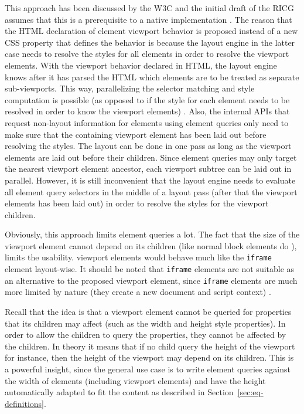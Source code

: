 \documentclass[a4paper,11pt]{kth-mag}
\newcommand{\code}[1]{\texttt{#1}}
\begin{document}
      This approach has been discussed by the \gls{W3C} and the initial draft of the \gls{RICG} assumes that this is a prerequisite to a \gls{native} implementation \cite{w3c_eq_mail,ricg_irc_log}.
      The reason that the \gls{HTML} declaration of element \gls{viewport} behavior is proposed instead of a new \gls{CSS} property that defines the behavior is because the \gls{layout engine} in the latter case needs to resolve the styles for all \glspl{element} in order to resolve the \gls{viewport} \glspl{element}.
      With the \gls{viewport} behavior declared in \gls{HTML}, the \gls{layout engine} knows after it has parsed the \gls{HTML} which \glspl{element} are to be treated as separate sub-\glspl{viewport}.
      This way, parallelizing the selector matching and style computation is possible (as opposed to if the style for each element needs to be resolved in order to know the \gls{viewport} \glspl{element}) \cite{w3c_eq_mail}.
      Also, the internal \glspl{API} that request non-layout information for \glspl{element} using element queries only need to make sure that the containing \gls{viewport} \gls{element} has been laid out before resolving the styles.
      The layout can be done in one pass as long as the \gls{viewport} \glspl{element} are laid out before their children.
      Since element queries may only target the nearest \gls{viewport} \gls{element} ancestor, each \gls{viewport} subtree can be laid out in parallel.
      However, it is still inconvenient that the \gls{layout engine} needs to evaluate all element query selectors in the middle of a layout pass (after that the \gls{viewport} \glspl{element} has been laid out) in order to resolve the styles for the \gls{viewport} children.

      Obviously, this approach limits element queries a lot.
      The fact that the size of the \gls{viewport} \gls{element} cannot depend on its children (like normal block \glspl{element} do \cite{w3c_css21}), limits the usability.
      \Gls{viewport} \glspl{element} would behave much like the \code{iframe} \gls{element} layout-wise.
      It should be noted that \code{iframe} \glspl{element} are not suitable as an alternative to the proposed \gls{viewport} \gls{element}, since \code{iframe} \glspl{element} are much more limited by nature (they create a new \gls{document} and script context) \cite{w3c_css21}.

      Recall that the idea is that a \gls{viewport} element cannot be queried for properties that its children may affect (such as the width and height style properties).
      In order to allow the children to query the properties, they cannot be affected by the children.
      In theory it means that if no child query the height of the \gls{viewport} for instance, then the height of the \gls{viewport} may depend on its children.
      This is a powerful insight, since the general use case is to write element queries against the width of \glspl{element} (including \gls{viewport} \glspl{element}) and have the height automatically adapted to fit the content as described in Section~\ref{sec:eq-definitions}.
\end{document}
